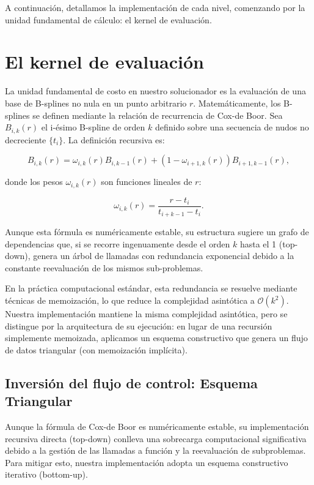 A continuación, detallamos la implementación de cada nivel, comenzando por la unidad fundamental de cálculo: el kernel de evaluación.

\section{El kernel de evaluación}

La unidad fundamental de costo en nuestro solucionador es la evaluación de una base de B-splines no nula en un punto arbitrario \( r \). Matemáticamente, los B-splines se definen mediante la relación de recurrencia de Cox-de Boor. Sea \( B_{i,k}(r) \) el i-ésimo B-spline de orden \( k \) definido sobre una secuencia de nudos no decreciente \( \{t_i\} \). La definición recursiva es:

\begin{equation}
\label{eq:cox-deboor2}
B_{i,k}(r) = \omega_{i,k}(r) B_{i,k-1}(r) + (1-\omega_{i+1,k}(r))B_{i+1,k-1}(r),
\end{equation}

donde los pesos \( \omega_{i,k}(r) \) son funciones lineales de \( r \):

\begin{equation}
\label{eq:cdb-weights}
\omega_{i,k}(r) = \frac{r-t_i}{t_{i+k-1}-t_i}.
\end{equation}

Aunque esta fórmula es numéricamente estable, su estructura sugiere un grafo de dependencias que, si se recorre ingenuamente desde el orden \( k \) hasta el 1 (top-down), genera un árbol de llamadas con redundancia exponencial debido a la constante reevaluación de los mismos sub-problemas.

En la práctica computacional estándar, esta redundancia se resuelve mediante técnicas de memoización, lo que reduce la complejidad asintótica a \( \mathcal{O}(k^2) \). Nuestra implementación mantiene la misma complejidad asintótica, pero se distingue por la arquitectura de su ejecución: en lugar de una recursión simplemente memoizada, aplicamos un esquema constructivo que genera un flujo de datos triangular (con memoización implícita).

\subsection{Inversión del flujo de control: Esquema Triangular}

Aunque la fórmula de Cox-de Boor es numéricamente estable, su implementación recursiva directa (top-down) conlleva una sobrecarga computacional significativa debido a la gestión de las llamadas a función y la reevaluación de subproblemas. Para mitigar esto, nuestra implementación adopta un esquema constructivo iterativo (bottom-up).

